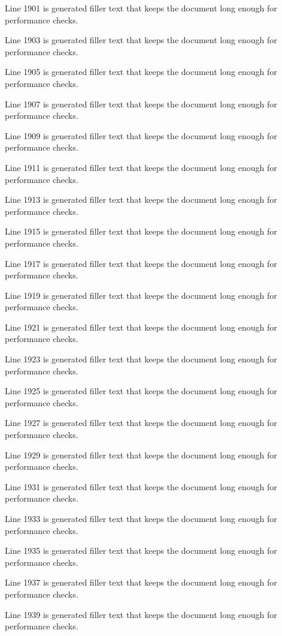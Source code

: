 Line 1901 is generated filler text that keeps the document long enough for performance checks.

Line 1903 is generated filler text that keeps the document long enough for performance checks.

Line 1905 is generated filler text that keeps the document long enough for performance checks.

Line 1907 is generated filler text that keeps the document long enough for performance checks.

Line 1909 is generated filler text that keeps the document long enough for performance checks.

Line 1911 is generated filler text that keeps the document long enough for performance checks.

Line 1913 is generated filler text that keeps the document long enough for performance checks.

Line 1915 is generated filler text that keeps the document long enough for performance checks.

Line 1917 is generated filler text that keeps the document long enough for performance checks.

Line 1919 is generated filler text that keeps the document long enough for performance checks.

Line 1921 is generated filler text that keeps the document long enough for performance checks.

Line 1923 is generated filler text that keeps the document long enough for performance checks.

Line 1925 is generated filler text that keeps the document long enough for performance checks.

Line 1927 is generated filler text that keeps the document long enough for performance checks.

Line 1929 is generated filler text that keeps the document long enough for performance checks.

Line 1931 is generated filler text that keeps the document long enough for performance checks.

Line 1933 is generated filler text that keeps the document long enough for performance checks.

Line 1935 is generated filler text that keeps the document long enough for performance checks.

Line 1937 is generated filler text that keeps the document long enough for performance checks.

Line 1939 is generated filler text that keeps the document long enough for performance checks.

